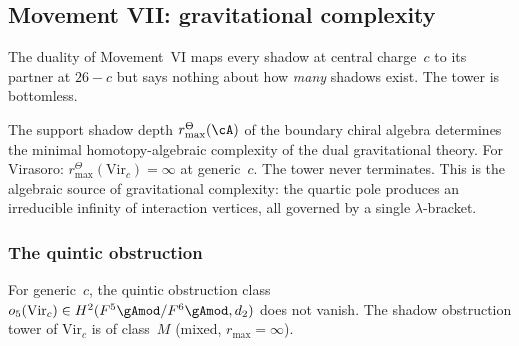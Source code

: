 \subsection{Movement VII: gravitational complexity}
\label{subsec:gravity-complexity}

The duality of Movement~VI maps every shadow at central
charge~$c$ to its partner at $26 - c$ but says nothing about
how \emph{many} shadows exist. The tower is bottomless.

The support shadow depth \(r^\Theta_{\max}(\cA)\) of the boundary chiral algebra
determines the minimal homotopy-algebraic complexity of the dual
gravitational theory. For Virasoro:
\(r^\Theta_{\max}(\mathrm{Vir}_c) = \infty\) at generic~$c$. The tower
never terminates. This is the algebraic source of gravitational
complexity: the quartic pole produces an irreducible infinity of
interaction vertices, all governed by a single $\lambda$-bracket.

\subsubsection*{The quintic obstruction}

\begin{theorem}
\label{thm:gravity-quintic-obstruction}
For generic~$c$, the quintic obstruction class
$o_5(\mathrm{Vir}_c) \in H^2(F^5\gAmod/F^6\gAmod, d_2)$
does not vanish. The shadow obstruction tower of $\mathrm{Vir}_c$ is of
class~$M$ \textup{(}mixed, $r_{\max} = \infty$\textup{)}.
\end{theorem}

